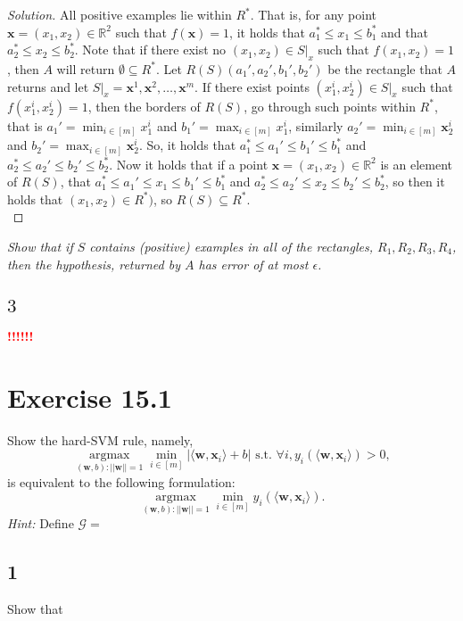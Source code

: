 \documentclass[10pt, a4paper, twoside]{amsart}
\newcommand{\R}{\ensuremath{\mathbb{R}}}
\newcommand{\argmax}{\operatorname*{argmax}}
\newenvironment{solution}
               {\let\oldqedsymbol=\qedsymbol
                \renewcommand{\qedsymbol}{$\blacktriangleleft$}
                \begin{proof}[Solution]}
               {\end{proof}
                \renewcommand{\qedsymbol}{\oldqedsymbol}}
\newcommand{\TODO}{\textcolor{red}{\textbf{!!!!!! }}}
\begin{document}
\begin{solution}
All positive examples lie within $R^*$. That is, for any point $\mathbf{x} = (x_1,x_2) \in \R^2$ such that $f(\mathbf{x})=1$, it holds that $a_1^*\leq x_1 \leq b_1^*$ and that $a_2^*\leq x_2 \leq b_2^*$. Note that if there exist no $(x_1,x_2) \in S|_x$ such that $f(x_1,x_2)=1$, then $A$ will return $\emptyset \subseteq R^*$. Let $R(S)(a_1',a_2',b_1',b_2')$ be the rectangle that $A$ returns and let $S|_x = {\mathbf{x}^1, \mathbf{x}^2,\ldots, \mathbf{x}^m}$. If there exist points $(x^i_1,x^i_2)\in S|_x$ such that $f(x^i_1,x^i_2)=1$, then the borders of $R(S)$, go through such points within $R^*$, that is $a_1' = \min_{i\in [m]} x^i_1$ and $b_1' = \max_{i\in [m]} x^i_1$, similarly $a_2' = \min_{i\in [m]} \mathbf{x}^i_2$ and $b_2' = \max_{i\in [m]} \mathbf{x}^i_2$. So, it holds that $a_1^*\leq a_1'\leq b_1' \leq b_1^*$ and $a_2^* \leq a_2' \leq b_2' \leq b_2^*$. Now it holds that if a point $\mathbf{x} = (x_1, x_2)\in \R^2$ is an element of $R(S)$, that $a_1^*\leq a_1'\leq x_1 \leq b_1' \leq b_1^*$ and $a_2^* \leq a_2'\leq x_2 \leq b_2' \leq b_2^*$, so then it holds that $(x_1,x_2) \in R^*)$, so $R(S) \subseteq R^*$.\\
\end{solution}
\textit{Show that if $S$ contains (positive) examples in all of the rectangles, $R_1, R_2, R_3, R_4$, then the hypothesis, returned by $A$ has error of at most $\epsilon$.}
\subsection*{$3$}
\TODO

\section*{Exercise 15.1}
Show the hard-SVM rule, namely,
\begin{equation*}
  \argmax_{(\mathbf{w},b):||\mathbf{w}||=1} \min_{i \in [m]}|\langle \mathbf{w}, \mathbf{x}_i \rangle + b |
  \text{ s.t. } \forall i, y_i (\langle \mathbf{w}, \mathbf{x}_i \rangle ) > 0,
\end{equation*}
is equivalent to the following formulation:
\begin{equation*}
  \argmax_{(\mathbf{w},b):||\mathbf{w}||=1} \min_{i \in [m]} y_i (\langle \mathbf{w}, \mathbf{x}_i \rangle ).
\end{equation*}
\textit{Hint:} Define $\mathcal{G}={}$
\subsection*{1}
Show that 
\end{document}
